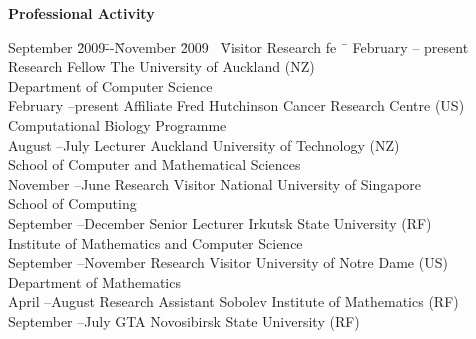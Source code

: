 \documentclass[12pt]{article}
\begin{document}
\centerline{\bf Professional Activity}
\begin{tabbing}
September \=2009\=--\=November \=2009 \ \= Visitor Research fe \ \= \kill
February \>--\> present \> \> Research Fellow \> The University of Auckland (NZ)\\
                \>        \>   \>             \>          \>                          \> Department of Computer Science\\
February \>--\>present\>  \> Affiliate   \> Fred Hutchinson Cancer Research Centre (US)\\
                \>        \>   \>             \>          \>                          \> Computational Biology Programme \\
August \>--\>July \> Lecturer \> Auckland University of Technology (NZ)\\
                \>        \>   \>             \>          \>                          \> School of Computer and Mathematical Sciences\\
November       \>--\>June     \> Research Visitor \> National University of Singapore\\
\> \>\>\>          \>                                  \>School of Computing\\
September \>--\>December  \> Senior Lecturer     \> Irkutsk State University (RF)\\
                \>        \>   \>             \>          \>                          \>Institute of Mathematics and Computer Science\\
September \>--\>November  \> Research Visitor   \> University of Notre Dame (US)\\
                \>        \>   \>             \>          \>                          \>Department of Mathematics \\
April           \>--\>August                   \> Research Assistant     \> Sobolev Institute of Mathematics (RF)\\
September \>--\>July                      \> GTA                          \> Novosibirsk State University (RF)\\
\end{tabbing}
\end{document}
